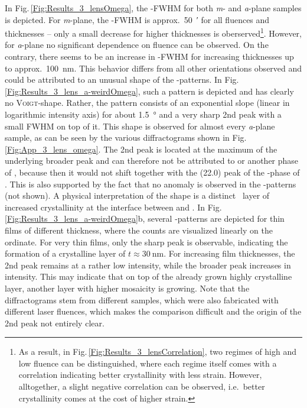 In Fig.\,\ref{Fig:Results_3_lensOmega}, the \textomega-FWHM for both \textit{m}- and \textit{a}-plane samples is depicted.
For \textit{m}-plane, the \textomega-FWHM is approx.\ \qty{50}{\arcminute} for all fluences and thicknesses -- only a small decrease for higher thicknesses is oberserved\footnote{
    As a result, in Fig.\,\ref{Fig:Results_3_lensCorrelation}, two regimes of high and low fluence can be distinguished, where each regime itself comes with a correlation indicating better crystallinity with less strain.
    However, alltogether, a slight negative correlation can be observed, i.e.\ better crystallinity comes at the cost of higher strain.
}.
However, for \textit{a}-plane no significant dependence on fluence can be observed.
On the contrary, there seems to be an increase in \textomega-FWHM for increasing thicknesses up to approx.\ \qty{100}{\nm}.
This behavior differs from all other orientations observed and could be attributed to an unusual shape of the \textomega-patterns.
In Fig.\,\ref{Fig:Results_3_lens_a-weirdOmega}, such a pattern is depicted and has clearly no \textsc{Voigt}-shape.
Rather, the pattern consists of an exponential slope (linear in logarithmic intensity axis) for about \qty{1.5}{\degree} and a very sharp 2nd peak with a small \gls{FWHM} on top of it.
This shape is observed for almost every \textit{a}-plane sample, as can be seen by the various diffractograms shown in Fig.\,\ref{Fig:App_3_lens_omega}.
The 2nd peak is located at the maximum of the underlying broader peak and can therefore not be attributed to  or another phase of \cro, because then it would not shift together with the (22.0) peak of the \textalpha-phase of \cro.
This is also supported by the fact that no anomaly is observed in the \thetaomega-patterns (not shown).
A physical interpretation of the shape is a distinct \cro\ layer of increased crystallinity at the interface between  and \cro.
In Fig.\,\ref{Fig:Results_3_lens_a-weirdOmega}b, several \textomega-patterns are depicted for thin films of different thickness, where the counts are visualized linearly on the ordinate.
For very thin films, only the sharp peak is observable, indicating the formation of a crystalline layer of $t\approx\qty{30}{\nm}$.
For increasing film thicknesses, the 2nd peak remains at a rather low intensity, while the broader peak increases in intensity.
This may indicate that on top of the already grown highly crystalline layer, another layer with higher mosaicity is growing.
Note that the diffractograms stem from different samples, which were also fabricated with different laser fluences, which makes the comparison difficult and the origin of the 2nd peak not entirely clear.
